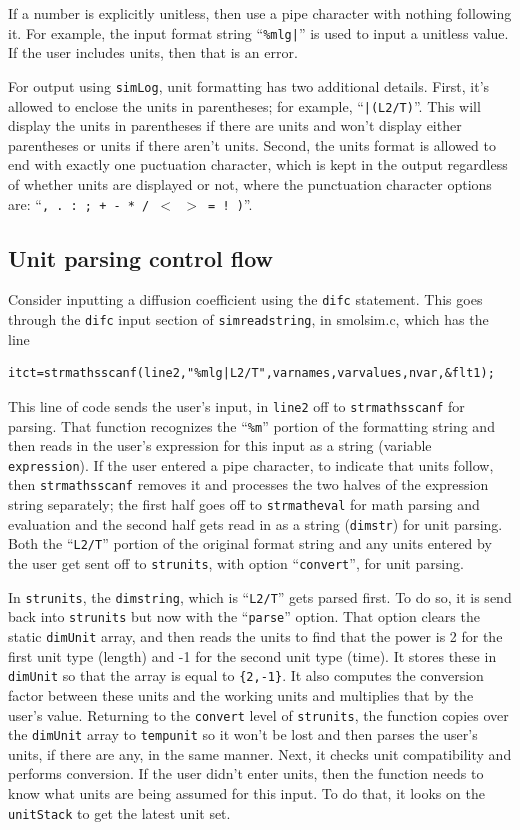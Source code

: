 \documentclass {scrbook}
\newcommand {\ttt} {\texttt}
\begin{document}
If a number is explicitly unitless, then use a pipe character with nothing following it. For example, the input format string ``\ttt{\%mlg|}'' is used to input a unitless value. If the user includes units, then that is an error.

For output using \ttt{simLog}, unit formatting has two additional details. First, it's allowed to enclose the units in parentheses; for example, ``\ttt{|(L2/T)}''. This will display the units in parentheses if there are units and won't display either parentheses or units if there aren't units. Second, the units format is allowed to end with exactly one puctuation character, which is kept in the output regardless of whether units are displayed or not, where the punctuation character options are: ``\ttt{, . : ; + - * / $<$ $>$ = ! )}''.


\subsection{Unit parsing control flow}

Consider inputting a diffusion coefficient using the \ttt{difc} statement. This goes through the \ttt{difc} input section of \ttt{simreadstring}, in smolsim.c, which has the line
\begin{lstlisting}
itct=strmathsscanf(line2,"%mlg|L2/T",varnames,varvalues,nvar,&flt1);
\end{lstlisting}
This line of code sends the user's input, in \ttt{line2} off to \ttt{strmathsscanf} for parsing. That function recognizes the ``\ttt{\%m}'' portion of the formatting string and then reads in the user's expression for this input as a string (variable \ttt{expression}). If the user entered a pipe character, to indicate that units follow, then \ttt{strmathsscanf} removes it and processes the two halves of the expression string separately; the first half goes off to \ttt{strmatheval} for math parsing and evaluation and the second half gets read in as a string (\ttt{dimstr}) for unit parsing. Both the ``\ttt{L2/T}'' portion of the original format string and any units entered by the user get sent off to \ttt{strunits}, with option ``\ttt{convert}'', for unit parsing.

In \ttt{strunits}, the \ttt{dimstring}, which is ``\ttt{L2/T}'' gets parsed first. To do so, it is send back into \ttt{strunits} but now with the ``\ttt{parse}'' option. That option clears the static \ttt{dimUnit} array, and then reads the units to find that the power is 2 for the first unit type (length) and -1 for the second unit type (time). It stores these in \ttt{dimUnit} so that the array is equal to \ttt{\{2,-1\}}. It also computes the conversion factor between these units and the working units and multiplies that by the user's value. Returning to the \ttt{convert} level of \ttt{strunits}, the function copies over the \ttt{dimUnit} array to \ttt{tempunit} so it won't be lost and then parses the user's units, if there are any, in the same manner. Next, it checks unit compatibility and performs conversion. If the user didn't enter units, then the function needs to know what units are being assumed for this input. To do that, it looks on the \ttt{unitStack} to get the latest unit set.
\end{document}
